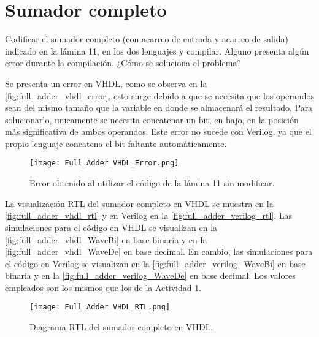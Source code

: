 \section{Sumador completo \label{sec:s2}}

\begin{center}
	\begin{minipage}{12cm}
		\begin{tcolorbox}[title=Actividad 2]
			Codificar el sumador completo (con acarreo de entrada y acarreo de salida) indicado en la lámina 11, en los dos lenguajes y compilar. Alguno presenta algún error durante la compilación. ¿Cómo se soluciona el problema?
		\end{tcolorbox}	
	\end{minipage}
\end{center}

Se presenta un error en VHDL, como se observa en la \autoref{fig:full_adder_vhdl_error}, esto surge debido a que se necesita que los operandos sean del mismo tamaño que la variable en donde se almacenará el resultado. Para solucionarlo, unicamente se necesita concatenar un bit, en bajo, en la posición más significativa de ambos operandos. Este error no sucede con Verilog, ya que el propio lenguaje concatena el bit faltante automáticamente.

\begin{figure}[ht]
	\centering
	\texttt{[image: Full\_Adder\_VHDL\_Error.png]}
	\caption{Error obtenido al utilizar el código de la lámina 11 sin modificar. \label{fig:full_adder_vhdl_error}}
\end{figure}

La visualización RTL del sumador completo en VHDL se muestra en la \autoref{fig:full_adder_vhdl_rtl} y en Verilog en la \autoref{fig:full_adder_verilog_rtl}. Las simulaciones para el código en VHDL se visualizan en la \autoref{fig:full_adder_vhdl_WaveBi} en base binaria y en la \autoref{fig:full_adder_vhdl_WaveDe} en base decimal. En cambio, las simulaciones para el código en Verilog se visualizan en la \autoref{fig:full_adder_verilog_WaveBi} en base binaria y en la \autoref{fig:full_adder_verilog_WaveDe} en base decimal. Los valores empleados son los mismos que los de la Actividad 1.

\begin{figure}[ht]
	\centering
	\texttt{[image: Full\_Adder\_VHDL\_RTL.png]}
	\caption{Diagrama RTL del sumador completo en VHDL. \label{fig:full_adder_vhdl_rtl}}
\end{figure}

